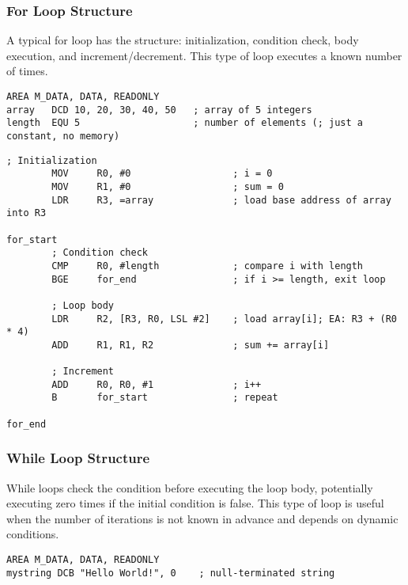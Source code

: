 \subsubsection{For Loop Structure}
A typical for loop has the structure: initialization, condition check, body execution, and increment/decrement. This type of loop executes a known number of times.
\begin{lstlisting}[caption={Declaring Array and Length}]
        AREA M_DATA, DATA, READONLY
array   DCD 10, 20, 30, 40, 50   ; array of 5 integers
length  EQU 5                    ; number of elements (; just a constant, no memory)
\end{lstlisting}
\newpage
\begin{lstlisting}[caption={For loop implementation pattern}]
        ; Initialization
        MOV     R0, #0                  ; i = 0
        MOV     R1, #0                  ; sum = 0
        LDR     R3, =array              ; load base address of array into R3

for_start
        ; Condition check
        CMP     R0, #length             ; compare i with length
        BGE     for_end                 ; if i >= length, exit loop

        ; Loop body
        LDR     R2, [R3, R0, LSL #2]    ; load array[i]; EA: R3 + (R0 * 4)
        ADD     R1, R1, R2              ; sum += array[i]

        ; Increment
        ADD     R0, R0, #1              ; i++
        B       for_start               ; repeat

for_end
\end{lstlisting}
\subsubsection{While Loop Structure}
While loops check the condition before executing the loop body, potentially executing zero times if the initial condition is false. This type of loop is useful when the number of iterations is not known in advance and depends on dynamic conditions.
\begin{lstlisting}[caption={Declaring Null-Terminated String}]
        AREA M_DATA, DATA, READONLY
mystring DCB "Hello World!", 0    ; null-terminated string
\end{lstlisting}
